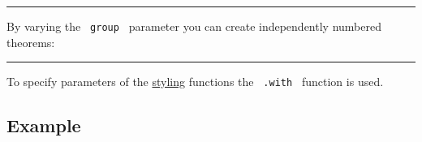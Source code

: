\begin{center}\rule{0.5\linewidth}{0.5pt}\end{center}

By varying the \texttt{\ group\ } parameter you can create independently
numbered theorems:

\begin{Shaded}
\begin{Highlighting}[]

\end{Highlighting}
\end{Shaded}

\begin{center}\rule{0.5\linewidth}{0.5pt}\end{center}

To specify parameters of the
\href{https://github.com/typst/packages/raw/main/packages/preview/lemmify/0.1.6/\#styling-parameters}{styling}
functions the \texttt{\ .with\ } function is used.

\begin{Shaded}
\begin{Highlighting}[]
\NormalTok{)}
\end{Highlighting}
\end{Shaded}

\subsection{Example}\label{example}

